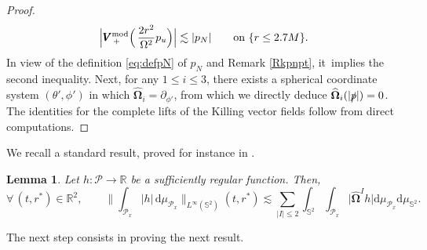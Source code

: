 \documentclass[10pt]{amsart}
\theoremstyle{plain}
\newtheorem{lemma}[proposition]{Lemma}
\theoremstyle{definition}
\newcommand\R{{\mathbb{R}}}
\newcommand\dr{{\mathrm{d}}}
\begin{document}
\begin{proof}
\[
\Big| \pmb{V}_{\, +}^{ \mathrm{mod}} \Bigl(\, \frac{2r^2 }{\Omega^2}p_u \Bigr) \Big| \lesssim |p_N| \qquad \text{on $\{ r \leq 2.7M \}$}.
\]
In view of the definition \eqref{eq:defpN} of $p_N$ and Remark \ref{Rkpnpt}, it~implies the second inequality. Next, for any $1 \leq i \leq 3$, there exists a spherical coordinate system $(\theta',\phi')$ in which $\widehat{\mathbf{\Omega}}_i=\partial_{\phi'}$, from which we directly deduce $\widehat{\mathbf{\Omega}}_i(|\slashed{p}|)=0$. The identities for the complete lifts of the Killing vector fields follow from direct computations.
\end{proof}

\pagebreak[2]
We recall a standard result, proved for instance in \cite[Lem.\,5.2]{L23}.

\begin{lemma}\label{Sobsphere}
Let $h : \mathcal{P} \to \R$ be a sufficiently regular function. Then,
\[
\forall \, (t,r^*) \in \R^2, \qquad \biggl\| \int_{\mathcal{P}_x} |h| \, \dr \mu_{\mathcal{P}_x} \biggr\|_{L^\infty(\mathbb{S}^2)}(t,r^*) \lesssim \sum_{|I| \leq 2} \int_{\mathbb{S}^2} \int_{\mathcal{P}_x} \big| \widehat{\mathbf{\Omega}}^I h \big| \dr \mu_{\mathcal{P}_x} \dr \mu_{\mathbb{S}^2}.
\]
\end{lemma}

The next step consists in proving the next result.
\end{document}
